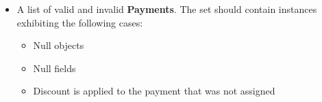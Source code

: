 		\begin{itemize}
				
				\item A list of valid and invalid \textbf{Payments}. The set should contain instances exhibiting the following cases:		
				\begin{itemize}
					\item Null objects
					\item Null fields
					\item Discount is applied to the payment that was not assigned
				\end{itemize}
		
		\end{itemize}
		
		
		
		
		
		
		
		
		
		
		
		